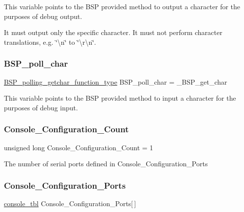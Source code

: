 This variable points to the B\+SP provided method to output a character for the purposes of debug output.

It must output only the specific character. It must not perform character translations, e.\+g. \char`\"{}\textbackslash{}n\char`\"{} to \char`\"{}\textbackslash{}r\textbackslash{}n\char`\"{}. \mbox{\label{arm_2beagle_2console_2console-config_8c_ae5846eecdfa8f2813504371bf01c29b0}} 
\subsubsection{\texorpdfstring{BSP\_poll\_char}{BSP\_poll\_char}}
{\footnotesize\ttfamily \mbox{\hyperlink{bspIo_8h_a132b9ceff428a634ece5dfaac7ef1006}{B\+S\+P\+\_\+polling\+\_\+getchar\+\_\+function\+\_\+type}} B\+S\+P\+\_\+poll\+\_\+char = \+\_\+\+B\+S\+P\+\_\+get\+\_\+char}

This variable points to the B\+SP provided method to input a character for the purposes of debug input. \mbox{\label{arm_2beagle_2console_2console-config_8c_a59f0ae8f9904bd193825ccfc2c99aeb6}} 
\subsubsection{\texorpdfstring{Console\_Configuration\_Count}{Console\_Configuration\_Count}}
{\footnotesize\ttfamily unsigned long Console\+\_\+\+Configuration\+\_\+\+Count = 1}

The number of serial ports defined in Console\+\_\+\+Configuration\+\_\+\+Ports \mbox{\label{arm_2beagle_2console_2console-config_8c_a8d1404b49209c3692a3dc1433710e550}} 
\subsubsection{\texorpdfstring{Console\_Configuration\_Ports}{Console\_Configuration\_Ports}}
{\footnotesize\ttfamily \mbox{\hyperlink{struct__console__tbl}{console\+\_\+tbl}} Console\+\_\+\+Configuration\+\_\+\+Ports\mbox{[}$\,$\mbox{]}}

